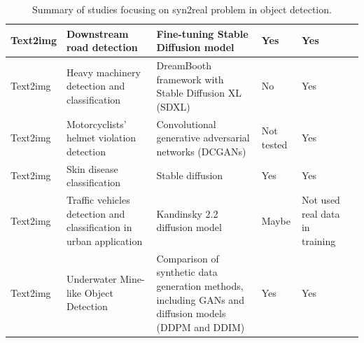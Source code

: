 \begin{table}[h!]
\begin{tabular}{p{2cm}|p{3cm}|p{3cm}|p{2cm}|p{2cm}|p{1.5cm}}
    Text2img & Downstream road detection & Fine-tuning Stable Diffusion model & Yes & Yes & \cite{tang2024crsdiffcontrollableremotesensing} \\ \hline

    Text2img & Heavy machinery detection and classification & DreamBooth framework with Stable Diffusion XL (SDXL) & No & Yes & \cite{xin2024dartautomatedendtoendobject} \\ \hline

    Text2img & Motorcyclists' helmet violation detection & Convolutional generative adversarial networks (DCGANs) & Not tested & Yes & \cite{a17050202} \\ \hline

    Text2img & Skin disease classification & Stable diffusion & Yes & Yes & \cite{akrout2023diffusionbaseddataaugmentationskin} \\ \hline

    Text2img & Traffic vehicles detection and classification in urban application & Kandinsky 2.2 diffusion model & Maybe & Not used real data in training & \cite{REUTOV2023335} \\ \hline

    Text2img & Underwater Mine-like Object Detection & Comparison of synthetic data generation methods, including GANs and diffusion models (DDPM and DDIM) & Yes & Yes & \cite{agrawal2024syn2realdomaingeneralizationunderwater} \\ \hline
    \end{tabular}
    \caption{Summary of studies focusing on syn2real problem in object detection.}
    \label{tab:syn2realtable}
\end{table}



